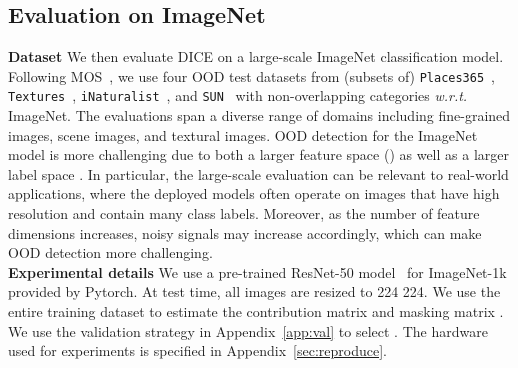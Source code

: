 \documentclass[runningheads]{llncs}
\begin{document}
\subsection{Evaluation on ImageNet}
\label{sec:imagenet}

\noindent \textbf{Dataset} We then evaluate DICE on a large-scale ImageNet classification model. Following MOS~\cite{huang2021mos}, we use four OOD test datasets from (subsets of) \texttt{Places365}~\cite{zhou2017places}, \texttt{Textures}~\cite{cimpoi2014describing}, \texttt{iNaturalist}~\cite{inat}, and \texttt{SUN}~\cite{sun} with non-overlapping categories \emph{w.r.t.} ImageNet. The evaluations span a diverse range of domains including fine-grained images, scene images, and textural images. OOD detection for the ImageNet model is more challenging due to both a larger feature space () as well as a larger label space . In particular, the large-scale evaluation can be relevant to real-world applications, where the deployed models often operate on images that have high resolution and contain many class labels. Moreover, as the number of feature dimensions increases, noisy signals may increase accordingly, which can make OOD detection more challenging.  \\

\noindent \textbf{Experimental details} 
We use a pre-trained ResNet-50 model~\cite{he2016identity} for ImageNet-1k provided by Pytorch.
At test time, all images are resized to 224  224. We use the entire training dataset to estimate the contribution matrix and masking matrix . We use the validation strategy in Appendix~\ref{app:val} to select .
The hardware used for experiments is specified in Appendix~\ref{sec:reproduce}. \\
\end{document}
